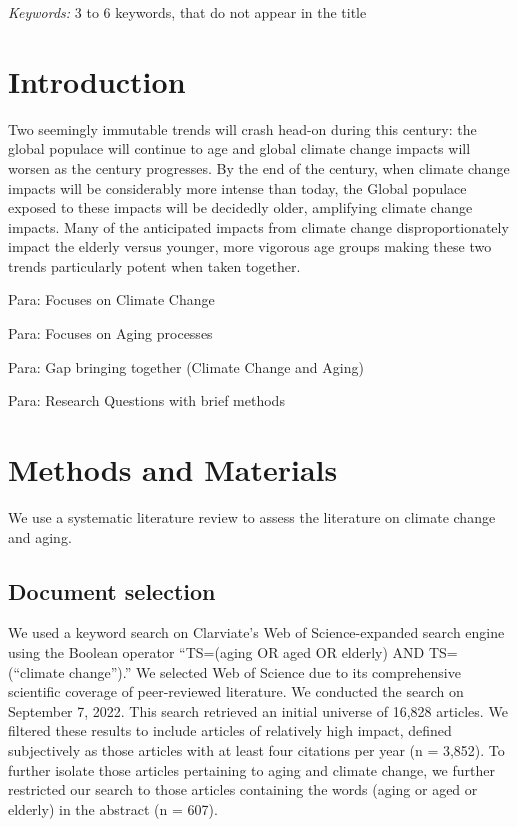 \documentclass[12pt]{article}
\begin{document}
\noindent%
{\it Keywords:} 3 to 6 keywords, that do not appear in the title
\vfill

\newpage
{} %

\hypertarget{introduction}{%
\section{Introduction}\label{introduction}}

Two seemingly immutable trends will crash head-on during this century:
the global populace will continue to age and global climate change
impacts will worsen as the century progresses. By the end of the
century, when climate change impacts will be considerably more intense
than today, the Global populace exposed to these impacts will be
decidedly older, amplifying climate change impacts. Many of the
anticipated impacts from climate change disproportionately impact the
elderly versus younger, more vigorous age groups making these two trends
particularly potent when taken together.

Para: Focuses on Climate Change

Para: Focuses on Aging processes

Para: Gap bringing together (Climate Change and Aging)

Para: Research Questions with brief methods

\hypertarget{methods-and-materials}{%
\section{Methods and Materials}\label{methods-and-materials}}

We use a systematic literature review to assess the literature on
climate change and aging.

\hypertarget{document-selection}{%
\subsection{Document selection}\label{document-selection}}

We used a keyword search on Clarviate's Web of Science-expanded search
engine using the Boolean operator ``TS=(aging OR aged OR elderly) AND
TS=(``climate change'').'' We selected Web of Science due to its
comprehensive scientific coverage of peer-reviewed literature. We
conducted the search on September 7, 2022. This search retrieved an
initial universe of 16,828 articles. We filtered these results to
include articles of relatively high impact, defined subjectively as
those articles with at least four citations per year (n = 3,852). To
further isolate those articles pertaining to aging and climate change,
we further restricted our search to those articles containing the words
(aging or aged or elderly) in the abstract (n = 607).
\end{document}
